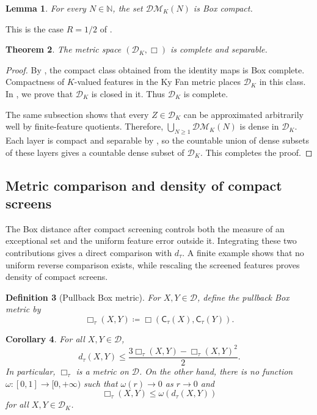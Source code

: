 \documentclass[10pt,a4paper]{amsart}
\newtheorem{theorem}{Theorem}[section]
\newtheorem{lemma}[theorem]{Lemma}
\newtheorem{corollary}[theorem]{Corollary}
\newtheorem{definition}[theorem]{Definition}
\newcommand{\D}{\mathcal D}
\newcommand{\DK}{\mathcal D_K}
\newcommand{\DM}{\mathcal{DM}}
\newcommand{\dtau}{d_{\tau}}
\begin{document}
\begin{lemma}
\label{lem:bounded-measurement-compact}
For every $N\in\mathbb N$, the set $\DM_K(N)$ is Box compact.
\end{lemma}

This is the case $R=1/2$ of \cite[Lemma~4.5]{gds2}.

\begin{theorem}
\label{thm:screened-polish}
The metric space $(\DK,\Box)$ is complete and separable.
\end{theorem}

\begin{proof}
By \cite[Theorem~4.10]{gds2}, the compact class obtained from the identity maps is Box complete. Compactness of $K$-valued features in the Ky Fan metric places $\DK$ in this class. In , we prove that $\DK$ is closed in it. Thus $\DK$ is complete.

The same subsection shows that every $Z\in\DK$ can be approximated arbitrarily well by finite-feature quotients. Therefore, $\bigcup_{N\geq1}\DM_K(N)$ is dense in $\DK$. Each layer is compact and separable by , so the countable union of dense subsets of these layers gives a countable dense subset of $\DK$. This completes the proof.
\end{proof}

\subsection{Metric comparison and density of compact screens}
\label{subsec:screen-comparison-density}

The Box distance after compact screening controls both the measure of an exceptional set and the uniform feature error outside it. Integrating these two contributions gives a direct comparison with $\dtau$. A finite example shows that no uniform reverse comparison exists, while rescaling the screened features proves density of compact screens.

\begin{definition}[Pullback Box metric]
\label{def:pullback-box}
For $X,Y\in\D$, define the \emph{pullback Box metric} by
\[
\Box_\tau(X,Y)\coloneqq
\Box(\mathsf C_\tau(X),\mathsf C_\tau(Y)).
\]
\end{definition}

\begin{corollary}
\label{cor:tau-box-comparison}
For all $X,Y\in\D$,
\[
\dtau(X,Y)
\leq\frac{3\Box_\tau(X,Y)-\Box_\tau(X,Y)^2}{2}.
\]
In particular, $\Box_\tau$ is a metric on $\D$. On the other hand, there is no function $\omega\colon[0,1]\to[0,+\infty)$ such that $\omega(r)\to0$ as $r\to0$ and
\[
\Box_\tau(X,Y)\leq\omega(\dtau(X,Y))
\]
for all $X,Y\in\DK$.
\end{corollary}
\end{document}
